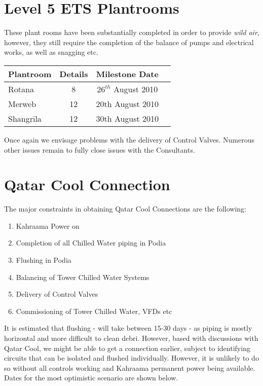 \section{Level 5 ETS Plantrooms}
These plant rooms have been substantially completed in order to provide \emph{wild air}, however, they still require the completion of the balance of pumps and electrical works, as well as snagging etc.

\begin{center} 
    \begin{tabular}{lccl}
      \toprule
      Plantroom   &  Details & Milestone Date  \\
      \midrule
      Rotana       &  8   &  $26^{th}$ August 2010  \\
      Merweb      &  12 &  20th August 2010  \\
      Shangrila    &  12 &  30th August 2010  \\
      \bottomrule
    \end{tabular}
 
  \end{center}

Once again we envisage problems with the delivery of Control Valves. Numerous other issues remain to fully close issues with the Consultants.

\section{Qatar Cool Connection}

The major constraints in obtaining Qatar Cool Connections are the following:

\begin{enumerate}
\item Kahraama Power  on
\item Completion of all Chilled Water piping in Podia
\item Flushing in Podia
\item Balancing of Tower Chilled Water Systems
\item Delivery of Control Valves
\item Commissioning of Tower Chilled Water, VFDs etc
\end{enumerate}

It is estimated that flushing - will take between 15-30 days - as piping is mostly horizontal and more difficult to clean debri. However, based with discussions with Qatar Cool, we might be able to get a connection earlier, subject to identifying circuits that can be isolated and flushed individually. However, it is unlikely to do so without all controls working and Kahraama permanent power being available. Dates for the most optimistic scenario are shown below.

